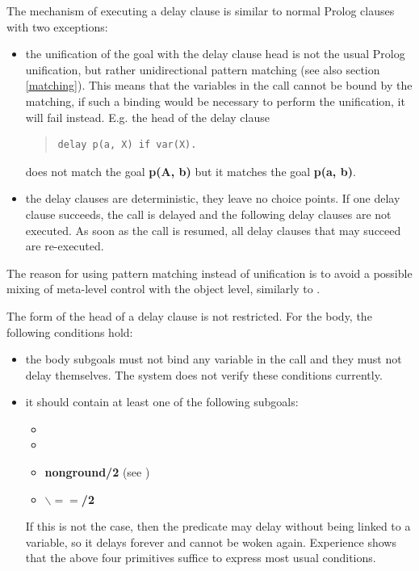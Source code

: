 The mechanism of executing a delay clause is similar to normal Prolog
clauses with two exceptions:
\begin{itemize}
\item the unification of the goal with the delay clause head is not the usual
Prolog unification, but rather unidirectional pattern matching
(see also section \ref{matching}).
This means that the variables in the call cannot be bound
by the matching, if such a binding would be necessary to
perform the unification, it will fail instead.
E.g. the head of the delay clause
\begin{quote}\begin{verbatim}
delay p(a, X) if var(X).
\end{verbatim}\end{quote}
does not match the goal {\bf p(A, b)} but it matches the goal {\bf p(a, b)}.

\item the delay clauses are deterministic, they leave no choice points.
If one delay clause succeeds, the call is delayed and the following delay
clauses are not executed.
As soon as the call is resumed, all delay clauses that may succeed
are re-executed.
\end{itemize}
The reason for using pattern matching instead of unification
is to avoid a possible mixing of meta-level control with the
object level, similarly to \cite{dincbas84}.


The form of the head of a delay clause is not restricted.
For the body, the following conditions hold:

\begin{itemize}
\item the body subgoals must not bind any variable in the call and they
must not delay themselves.
The system does not verify these conditions currently.

\item it should contain at least one of the following subgoals:
\begin{itemize}
\item {}
\item {}
\item {\bf nonground/2} (see )
\item {\bf $\backslash==$/2}
\end{itemize}
If this is not the case, then the predicate may delay without being linked
to a variable, so it delays forever and cannot be woken again.
Experience shows that the above four primitives suffice to express most
usual conditions.
\end{itemize}

